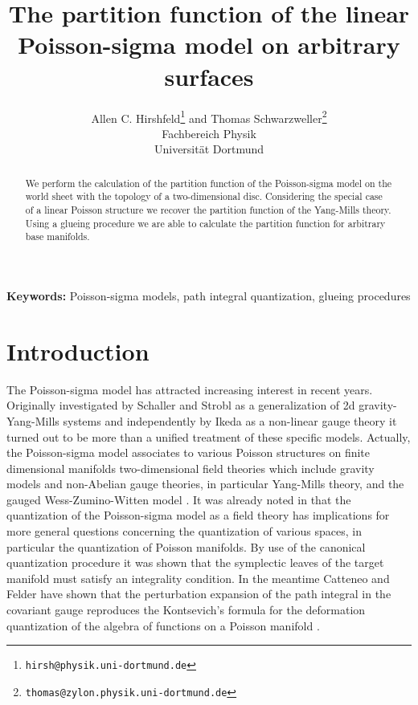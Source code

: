 \documentclass[a4paper,twoside,11pt]{article}
\title{The partition function of the linear Poisson-sigma model on arbitrary surfaces}
\author{ Allen C. Hirshfeld\footnote{\tt hirsh@physik.uni-dortmund.de}\myHighlight{$\;\;$}\coordHE{} and Thomas 
Schwarzweller\footnote{\tt thomas@zylon.physik.uni-dortmund.de}\\Fachbereich Physik\\Universit\"at Dortmund}
\numberwithin{equation}{section}
\begin{document}
%
%
\providecommand{\sss}{\scriptscriptstyle}
\providecommand{\mc}{\mathcal}
\providecommand{\bmult}{\begin{multline}\coord{}\boxAlignEqnarray{}
\providecommand{\emult}{}{0mm}{1}{1}{}
\providecommand{\emult}{}{0}\coordE{}\end{multline}}
\providecommand{\rd}{\mathrm d}
\providecommand{\Vol}{\text{Vol}}
%
%
\pagestyle{fancy}
\lhead{}
\rhead{}
\renewcommand{\headrulewidth}{0.3pt}
\renewcommand{\footrulewidth}{0pt}
%
%
\maketitle
\begin{abstract}
We perform the calculation of the  partition function of the Poisson-sigma model on the world sheet with 
the topology of a two-dimensional disc. Considering the special case of a linear Poisson structure we recover the partition function of the Yang-Mills theory. Using a glueing procedure we are able to 
calculate the partition function for arbitrary base manifolds.
\end{abstract}

%
%
{\bf Keywords:} Poisson-sigma models, path integral quantization, glueing procedures
%
\section{Introduction}
%
The Poisson-sigma model has attracted increasing interest in recent years. Originally investigated  by Schaller and Strobl as a 
generalization of 2d gravity-Yang-Mills systems \cite{SS} and independently by Ikeda as a non-linear gauge theory \cite{I} it turned out 
to be more than a unified  treatment of these specific models. 
Actually, the Poisson-sigma model  associates to various Poisson structures on finite dimensional manifolds two-dimensional 
field theories which include gravity models \cite{TS,KS,EKS}  and non-Abelian gauge theories, in particular Yang-Mills theory, and the 
gauged Wess-Zumino-Witten model \cite{ASS}. 
It was already noted in \cite{SS,SS2} that the quantization of the Poisson-sigma model as a field theory
has implications for more general questions concerning the quantization of various spaces, in particular
the quantization of Poisson 
manifolds. By use of the canonical quantization procedure it was shown that the symplectic leaves of the target manifold must satisfy 
an integrality condition. In the meantime 
Catteneo and Felder \cite{CF1} have shown that the perturbation expansion of the path integral in the covariant gauge 
reproduces the Kontsevich's formula for the deformation quantization of the algebra of functions on a Poisson manifold \cite{K}. 
\end{document}
